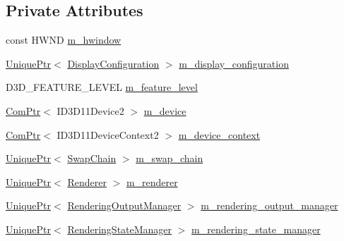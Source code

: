 \subsection*{Private Attributes}
\begin{DoxyCompactItemize}
\item 
const H\+W\+ND \hyperlink{classmage_1_1_rendering_manager_a75a2ed9a4bac39c2b03960ceadd6c7dd}{m\+\_\+hwindow}
\item 
\hyperlink{namespacemage_a3316d7143a973e37adf1110f2e80ca31}{Unique\+Ptr}$<$ \hyperlink{structmage_1_1_display_configuration}{Display\+Configuration} $>$ \hyperlink{classmage_1_1_rendering_manager_a23a8d0b6bccba3379eafcece28b28090}{m\+\_\+display\+\_\+configuration}
\item 
D3\+D\+\_\+\+F\+E\+A\+T\+U\+R\+E\+\_\+\+L\+E\+V\+EL \hyperlink{classmage_1_1_rendering_manager_a46dc60cd94efc7ad370fd64bd9d6813d}{m\+\_\+feature\+\_\+level}
\item 
\hyperlink{namespacemage_ae74f374780900893caa5555d1031fd79}{Com\+Ptr}$<$ I\+D3\+D11\+Device2 $>$ \hyperlink{classmage_1_1_rendering_manager_a565560e08553cc8414ec09901273275e}{m\+\_\+device}
\item 
\hyperlink{namespacemage_ae74f374780900893caa5555d1031fd79}{Com\+Ptr}$<$ I\+D3\+D11\+Device\+Context2 $>$ \hyperlink{classmage_1_1_rendering_manager_aac3b31f3e3ba242d3cd6d7551538021f}{m\+\_\+device\+\_\+context}
\item 
\hyperlink{namespacemage_a3316d7143a973e37adf1110f2e80ca31}{Unique\+Ptr}$<$ \hyperlink{classmage_1_1_swap_chain}{Swap\+Chain} $>$ \hyperlink{classmage_1_1_rendering_manager_acec25677bd92ddca6cb18efc1ed5fb38}{m\+\_\+swap\+\_\+chain}
\item 
\hyperlink{namespacemage_a3316d7143a973e37adf1110f2e80ca31}{Unique\+Ptr}$<$ \hyperlink{classmage_1_1_renderer}{Renderer} $>$ \hyperlink{classmage_1_1_rendering_manager_ade28531cb0299efcf297b09e9f35bd79}{m\+\_\+renderer}
\item 
\hyperlink{namespacemage_a3316d7143a973e37adf1110f2e80ca31}{Unique\+Ptr}$<$ \hyperlink{classmage_1_1_rendering_output_manager}{Rendering\+Output\+Manager} $>$ \hyperlink{classmage_1_1_rendering_manager_a305697e04c779ea637c1e11ae9065a69}{m\+\_\+rendering\+\_\+output\+\_\+manager}
\item 
\hyperlink{namespacemage_a3316d7143a973e37adf1110f2e80ca31}{Unique\+Ptr}$<$ \hyperlink{classmage_1_1_rendering_state_manager}{Rendering\+State\+Manager} $>$ \hyperlink{classmage_1_1_rendering_manager_aa31eab8068bf43e3b90f72644495c16a}{m\+\_\+rendering\+\_\+state\+\_\+manager}
\end{DoxyCompactItemize}


